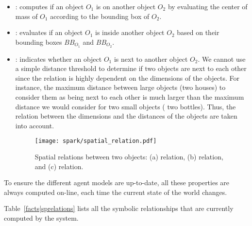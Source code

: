 \begin{itemize}
	\item {}: computes if an object $O_1$ is on another object $O_2$ by
	evaluating the center of mass of $O_1$ according to the bounding box of $O_2$.

	\item {}: evaluates if an object $O_1$ is inside another object
	$O_2$ based on their bounding boxes $BB_{O_1}$ and $BB_{O_2}$.

	\item {}: indicates whether an object $O_1$ is next to another
	object $O_2$. We cannot use a simple distance threshold to determine if two
	objects are next to each other since the relation is highly dependent on the
	dimensions of the objects. For instance, the maximum distance between large
	objects (\eg two houses) to consider them as being next to each other is much
	larger than the maximum distance we would consider for two small objects (\eg
	two bottles). Thus, the relation between the dimensions and the distances of
	the objects are taken into account.  

\begin{figure} 
	\centering
	\texttt{[image: spark/spatial\_relation.pdf]}
	\caption{Spatial relations between two objects: (a)  relation, 
	(b)  relation, and (c)  relation.} 
	\label{fig|sprelations} 
\end{figure}

\end{itemize} 

To ensure the different agent models are up-to-date, all these properties are
always computed on-line, each time the current state of the world changes.

Table~\ref{facts|sprelations} lists all the symbolic relationships that are
currently computed by the system.

